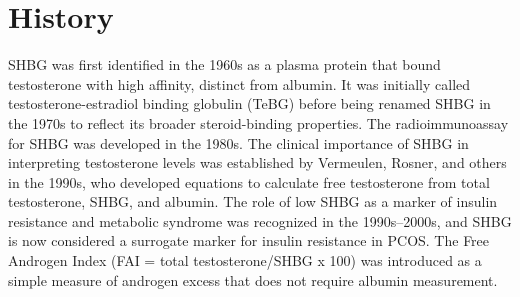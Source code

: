 \section*{History}
SHBG was first identified in the 1960s as a plasma protein that bound testosterone with high affinity, distinct from albumin. It was initially called testosterone-estradiol binding globulin (TeBG) before being renamed SHBG in the 1970s to reflect its broader steroid-binding properties. The radioimmunoassay for SHBG was developed in the 1980s. The clinical importance of SHBG in interpreting testosterone levels was established by Vermeulen, Rosner, and others in the 1990s, who developed equations to calculate free testosterone from total testosterone, SHBG, and albumin. The role of low SHBG as a marker of insulin resistance and metabolic syndrome was recognized in the 1990s--2000s, and SHBG is now considered a surrogate marker for insulin resistance in PCOS. The Free Androgen Index (FAI = total testosterone/SHBG x 100) was introduced as a simple measure of androgen excess that does not require albumin measurement.

